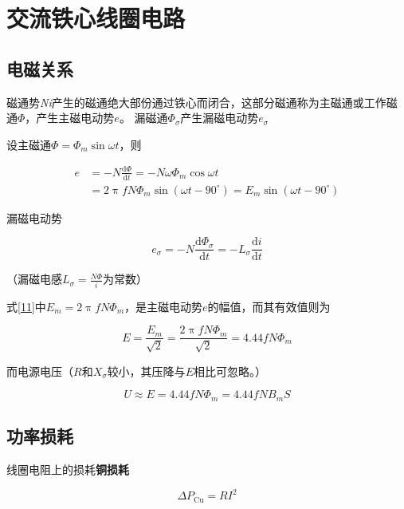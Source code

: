 \documentclass[12pt]{article}
\newcommand{\rmd}{\mathrm{d}}
\newcommand{\deriv}[2]{\frac{\rmd #1}{\rmd #2}}
\begin{document}
\section{交流铁心线圈电路}

\subsection{电磁关系}

磁通势\textit{Ni}产生的磁通绝大部份通过铁心而闭合，这部分磁通称为主磁通或工作磁通\(\Phi\)，产生主磁电动势\(e\)。
漏磁通\(\Phi_\sigma\)产生漏磁电动势\(e_\sigma\)

设主磁通\(\Phi = \Phi_m \sin \omega t\)，则

\begin{equation}
    \begin{aligned}
        e &= -N \deriv{\Phi}{t} = -N \omega \Phi_m \cos \omega t \\
        &=2 \uppi f N \Phi_m \sin (\omega t - 90^\circ) = E_m \sin (\omega t - 90^\circ)
    \end{aligned}
    \label{11}
\end{equation}

漏磁电动势

\begin{equation}
    e_\sigma = -N \deriv{\Phi_\sigma}{t} = - L_\sigma\deriv{i}{t}
\end{equation}

（漏磁电感\(L_\sigma = \frac{N \Phi}{i}\)为常数）

式\ref{11}中\(E_m = 2 \uppi f N \Phi_m\)，是主磁电动势\(e\)的幅值，而其有效值则为

\begin{equation}
    E = \frac{E_m}{\sqrt{2}} = \frac{2 \uppi f N \Phi_m}{\sqrt{2}} = 4.44 f N \Phi_m
\end{equation}

而电源电压（\(R\)和\(X_\sigma\)较小，其压降与\(E\)相比可忽略。）

\begin{equation}
    U \approx E = 4.44 f N \Phi_m = 4.44 f N B_m S
    \label{16}
\end{equation}

\subsection{功率损耗}

线圈电阻上的损耗\textbf{铜损耗}

\begin{equation}
\Delta P_{\text{Cu}} = R I^2
\end{equation}
\end{document}

